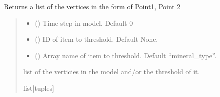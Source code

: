 \documentclass[letterpaper,10pt,english]{sphinxmanual}
\begin{document}
\begin{fulllineitems}
\begin{fulllineitems}
\label{\detokenize{openfdem:openfdem.openfdem.Model.model_vertices}}
\pysigstartsignatures
{}
\pysigstopsignatures
\sphinxAtStartPar
Returns a list of the vertices in the form of Point1, Point 2
\begin{quote}\begin{description}
\begin{itemize}
\item {} 
\sphinxAtStartPar
{} () \textendash{} Time step in model. Default 0

\item {} 
\sphinxAtStartPar
{} () \textendash{} ID of item to threshold. Default None.

\item {} 
\sphinxAtStartPar
{} () \textendash{} Array name of item to threshold. Default “mineral\_type”.

\end{itemize}

\sphinxAtStartPar
list of the verticies in the model and/or the threshold of it.

\sphinxAtStartPar
list{[}tuples{]}

\end{description}\end{quote}


\end{fulllineitems}
\end{fulllineitems}
\end{document}

